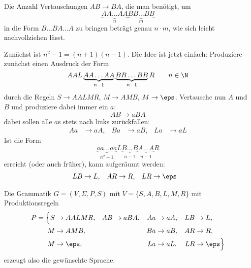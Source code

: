 \documentclass{mywork}
\begin{document}
\begin{aufgabe}~

	Die Anzahl Vertauschungen $AB \to BA$, die man benötigt, um
	\[
		\underbrace{AA\dotso AA}_{n}\underbrace{BB\dotso BB}_{m}
	\]
	in die Form $B \dotso BA \dotso A$ zu bringen beträgt genau $n\cdot m$, wie sich leicht nachvollziehen lässt.

	Zunächst ist $n^2-1 = (n+1)(n-1)$.
	Die Idee ist jetzt einfach: Produziere zunächst einen Ausdruck der Form
	\[
		AAL\underbrace{AA \dotso AA}_{n-1} \underbrace{BB \dotso BB}_{n-1}R
		\qquad n \in \N
	\]
	durch die Regeln $S \to AALMR$, $M \to AMB$, $M \to \eps$.
	Vertausche nun $A$ und $B$ und produziere dabei immer ein $a$:
	\[
		AB \to aBA
	\]
	dabei sollen alle $a$s stets nach links zurückfallen:
	\begin{align*}
		Aa &\to aA, &
		Ba &\to aB, &
		La &\to aL
	\end{align*}
	Ist die Form
	\[
		\underbrace{aa \dotso aa}_{n^2-1} L \underbrace{B \dotso B}_{n-1} \underbrace{A \dotso A}_{n-1} R
	\]
	erreicht (oder auch früher), kann aufgeräumt werden:
	\begin{align*}
		LB &\to L, &
		AR &\to R, &
		LR &\to \eps
	\end{align*}

	Die Grammatik $G = (V, \Sigma, P, S)$ mit $V=\{S,A,B,L,M,R\}$ mit Produktionsregeln
	\begin{align*}
		P = \Big\{
		S &\to AALMR, & AB &\to aBA, & Aa &\to aA, & LB &\to L, \\
		M &\to AMB, & & & Ba &\to aB, & AR &\to R, \\
		M &\to \eps, & & & La &\to aL, & LR &\to \eps \Big\}
	\end{align*}
	erzeugt also die gewünschte Sprache.
\end{aufgabe}
\end{document}
